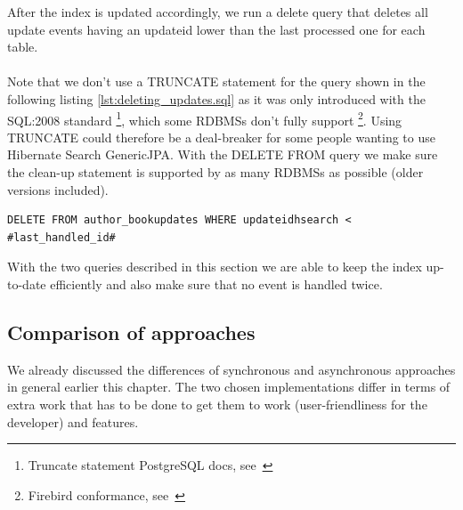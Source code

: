 \pagebreak
\noindent
After the index is updated accordingly, we run a delete query that deletes all update events
having an updateid lower than the last processed one for each table.
\\\\
Note that we don't use a TRUNCATE statement for the query shown in the following listing \ref{lst:deleting_updates.sql} as it was only introduced with the SQL:2008 standard \footnote{Truncate statement PostgreSQL docs, see~\cite{postgres_truncate}}, which some RDBMSs don't fully support \footnote{Firebird conformance, see~\cite{firebird_conformance}}. Using TRUNCATE could therefore be a deal-breaker for some people wanting to use Hibernate Search GenericJPA. With the DELETE FROM query we make sure the clean-up statement is supported by as many RDBMSs as possible (older versions included).
\\
\lstset{language=sql}
\begin{lstlisting}[frame=htrbl, caption={Deleting handled updates (Author\_Book)},
label={lst:deleting_updates.sql}]
DELETE FROM author_bookupdates WHERE updateidhsearch < #last_handled_id#
\end{lstlisting}
\noindent
With the two queries described in this section we are able to keep the index up-to-date efficiently and also make sure that no event is handled twice.

\pagebreak

\subsection{Comparison of approaches}

We already discussed the differences of synchronous and asynchronous approaches in general earlier this chapter. The two chosen implementations differ in terms of extra work that has to be done to get them to work (user-friendliness for the developer) and features.

